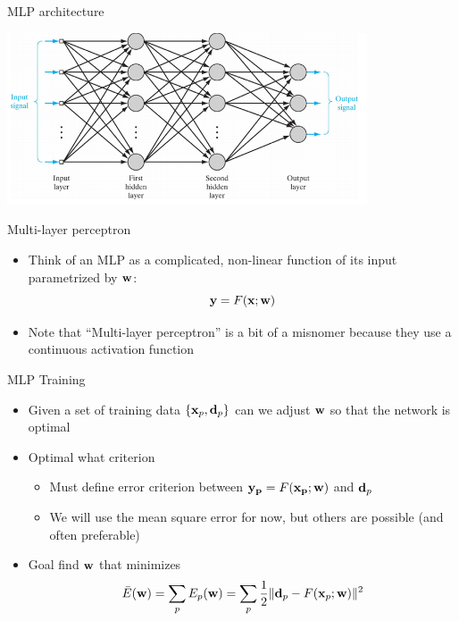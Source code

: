 \documentclass[notes]{beamer}
\providecommand{\tightlist}{%
  \setlength{\itemsep}{0pt}\setlength{\parskip}{0pt}}
\begin{document}
\begin{frame}{MLP architecture}

\centering 

\includegraphics[width=0.80000\textwidth]{2018-03-10-11-08-20.png}\\

\end{frame}

\begin{frame}{Multi-layer perceptron}

\begin{itemize}
\tightlist
\item
  Think of an MLP as a complicated, non-linear function of its input
  parametrized by \(\mathbf{w}\): \[\mathbf{y}=F(\mathbf{x};\mathbf{w})\]
\item
  Note that ``Multi-layer perceptron'' is a bit of a misnomer because
  they use a continuous activation function
\end{itemize}

\end{frame}

\begin{frame}{MLP Training}

\begin{itemize}
\tightlist
\item
  Given a set of training data \(\{\mathbf{x}_p,\mathbf{d}_p\}\) can we adjust \(\mathbf{w}\)
  so that the network is optimal
\item
  Optimal \wrt what criterion

  \begin{itemize}
  \tightlist
  \item
    Must define error criterion between \(\mathbf{y} _{\mathbf{p}} = F(\mathbf{x}_{\mathbf{p}} ; \mathbf{w})\)
    and \(\mathbf{d}_p\)
  \item
    We will use the mean square error for now, but others are possible
    (and often preferable)
  \end{itemize}
\item
  Goal find \(\mathbf{w}\) that minimizes
  \[  \bar{E}(\mathbf{w}) = \sum_p E_p(\mathbf{w}) = \sum_p \frac{1}{2} \|\mathbf{d}_p - F(\mathbf{x}_p ;\mathbf{w})\|^2\]
\end{itemize}

\end{frame}
\end{document}
